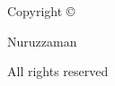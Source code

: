 \thispagestyle{empty}
\begin{center}

\vspace{8cm}

{Copyright \copyright {}}

{Nuruzzaman}

{All rights reserved}

\end{center}
